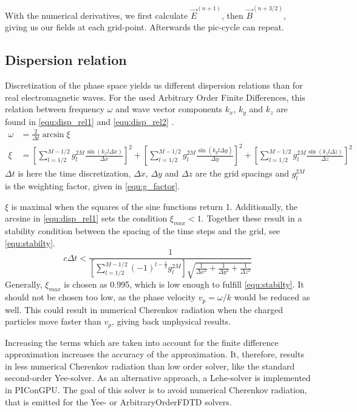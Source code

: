 \documentclass[bachelor_thesis]{subfiles}
\begin{document}
With the numerical derivatives, we first calculate $\vec{E}^{(n+1)}$, then $\vec{B}^{(n+3/2)}$, giving us our fields at each grid-point. Afterwards the \gls{pic}-cycle can repeat.

\subsection{Dispersion relation}
Discretization of the phase space yields us different dispersion relations than for real electromagnetic waves. For the used Arbitrary Order Finite Differences, this relation
between frequency $\omega$ and wave vector components $k_x$, $k_y$ and $k_z$ are found in \autoref{equ:disp_rel1} and \autoref{equ:disp_rel2} \cite{PICRepo}.
\begin{align}
\omega&=\frac{2}{\Delta t} \arcsin  \xi 			\label{equ:disp_rel1}	\\
\xi &= \left[\sum\limits_{l=1/2}^{M - 1/2} g_l^{2M} \frac{\sin( k_x l \Delta x)}{\Delta x} \right]^2
	+ \left[\sum\limits_{l=1/2}^{M - 1/2} g_l^{2M} \frac{\sin( k_y l \Delta y)}{\Delta y} \right]^2 + \left[\sum\limits_{l=1/2}^{M - 1/2} g_l^{2M} \frac{\sin( k_z l \Delta z)}{\Delta z} \right]^2 	\label{equ:disp_rel2}
\end{align}
$\Delta t$ is here the time discretization, $\Delta x$, $\Delta y$ and $\Delta z$ are the grid spacings and $g_l^{2M}$ is the weighting factor, given in \autoref{equ:g_factor}.

$\xi$ is maximal when the squares of the sine functions return 1. Additionally, the arcsine in \autoref{equ:disp_rel1} sets the condition $\xi_{max} < 1$.
Together these result in a stability condition between the spacing of the time steps and the grid, see \autoref{equ:stabilty}.
\begin{equation}
c\Delta t < \frac{1}{ \left[ \sum\limits_{l=1/2}^{M - 1/2} (-1)^{l-\frac{1}{2}} g_l^{2M} \right] \sqrt{ \frac{1}{\Delta x^2} + \frac{1}{\Delta y^2} + \frac{1}{\Delta z^2} }}
\label{equ:stabilty}
\end{equation}
Generally, $\xi_{max}$ is chosen as 0.995, which is low enough to fulfill \autoref{equ:stabilty}. It should not be chosen too low, as the phase velocity $v_p=\omega/k$
would be reduced as well. This could result in numerical Cherenkov radiation when the charged particles move faster than $v_p$, giving back unphysical results.

Increasing the terms which are taken into account for the finite difference approximation increases the accuracy of the approximation. It, therefore, results in less numerical Cherenkov radiation than low order solver, like the standard second-order Yee-solver.
As an alternative approach, a Lehe-solver \cite{Lehe2013} is implemented in PIConGPU. The goal of this solver is to avoid numerical Cherenkov radiation, that is emitted for the Yee- or ArbitraryOrderFDTD solvers.
\end{document}
